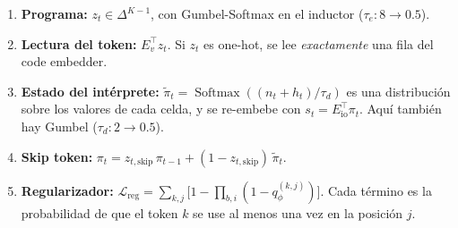 \documentclass[11pt,a4paper]{article}
\begin{document}
\begin{definicion}
\begin{enumerate}[leftmargin=*]
  \item \textbf{Programa:} $z_t\in\Delta^{K-1}$, con Gumbel-Softmax en el inductor ($\tau_e:8\to0.5$).
  \item \textbf{Lectura del token:} $E_v^{\top}z_t$. Si $z_t$ es one-hot, se lee \emph{exactamente} una fila del code embedder.
  \item \textbf{Estado del intérprete:} $\tilde\pi_t=\operatorname{Softmax}((n_t+h_t)/\tau_d)$ es una distribución sobre los valores de cada celda, y se re-embebe con $s_t=E_{\mathrm{io}}^{\top}\pi_t$. Aquí también hay Gumbel ($\tau_d:2\to0.5$).
  \item \textbf{Skip token:} $\pi_t=z_{t,\mathrm{skip}}\,\pi_{t-1}+(1-z_{t,\mathrm{skip}})\,\tilde\pi_t$.
  \item \textbf{Regularizador:} $\mathcal L_{\mathrm{reg}}=\sum_{k,j}\big[1-\prod_{b,i}(1-q^{(k,j)}_\phi)\big]$. Cada término es la probabilidad de que el token $k$ se use al menos una vez en la posición $j$.
\end{enumerate}
\end{definicion}
\end{document}
